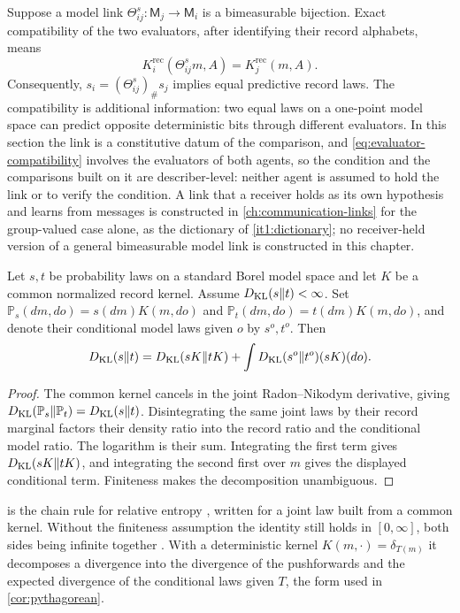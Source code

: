 Suppose a model link $\Theta^s_{ij}:\mathsf M_j\to\mathsf M_i$ is a bimeasurable bijection. Exact compatibility of the two evaluators, after identifying their record alphabets, means
\begin{equation}
K_i^{\mathrm{rec}}(\Theta^s_{ij}m,A)=K_j^{\mathrm{rec}}(m,A).
\label{eq:evaluator-compatibility}
\end{equation}
Consequently, $s_i=(\Theta^s_{ij})_\#s_j$ implies equal predictive record laws. The compatibility is additional information: two equal laws on a one-point model space can predict opposite deterministic bits through different evaluators. In this section the link is a constitutive datum of the comparison, and \cref{eq:evaluator-compatibility} involves the evaluators of both agents, so the condition and the comparisons built on it are describer-level: neither agent is assumed to hold the link or to verify the condition. A link that a receiver holds as its own hypothesis and learns from messages is constructed in \cref{ch:communication-links} for the group-valued case alone, as the dictionary of \cref{it1:dictionary}; no receiver-held version of a general bimeasurable model link is constructed in this chapter.

Let $s,t$ be probability laws on a standard Borel model space and let $K$ be a common normalized record kernel. Assume $D_{\mathrm{KL}}(s\Vert t)<\infty$. Set $\mathbb P_s(dm,do)=s(dm)K(m,do)$ and $\mathbb P_t(dm,do)=t(dm)K(m,do)$, and denote their conditional model laws given $o$ by $s^o,t^o$. Then
\begin{equation}
D_{\mathrm{KL}}(s\Vert t)
=D_{\mathrm{KL}}(sK\Vert tK)
+\int D_{\mathrm{KL}}(s^o\Vert t^o)(sK)(do).
\label{eq:predictive-chain}
\end{equation}
\begin{proof}
The common kernel cancels in the joint Radon--Nikodym derivative, giving $D_{\mathrm{KL}}(\mathbb P_s\Vert\mathbb P_t)=D_{\mathrm{KL}}(s\Vert t)$. Disintegrating the same joint laws by their record marginal factors their density ratio into the record ratio and the conditional model ratio. The logarithm is their sum. Integrating the first term gives $D_{\mathrm{KL}}(sK\Vert tK)$, and integrating the second first over $m$ gives the displayed conditional term. Finiteness makes the decomposition unambiguous.
\end{proof}

 is the chain rule for relative entropy \citep{KullbackLeibler1951,CoverThomas2006}, written for a joint law built from a common kernel. Without the finiteness assumption the identity still holds in $[0,\infty]$, both sides being infinite together \citep{Gray1990}. With a deterministic kernel $K(m,\cdot)=\delta_{T(m)}$ it decomposes a divergence into the divergence of the pushforwards and the expected divergence of the conditional laws given $T$, the form used in \cref{cor:pythagorean}.

